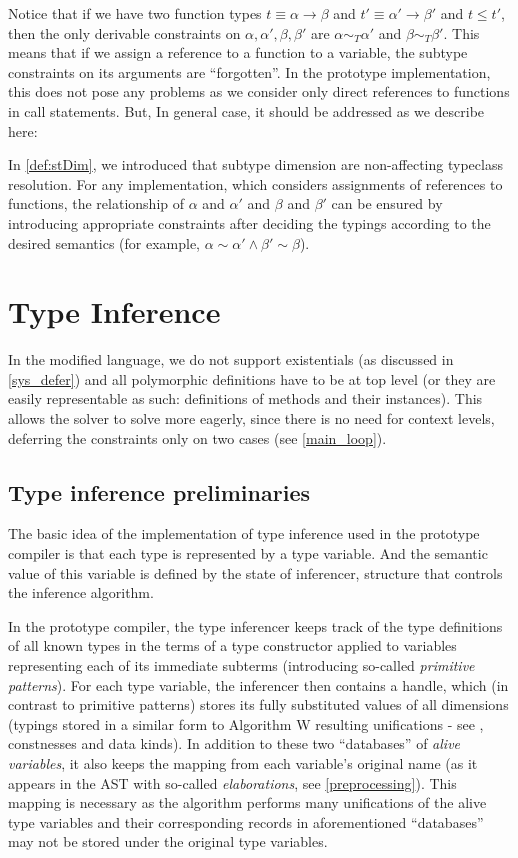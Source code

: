 Notice that if we have two function types $t \equiv \alpha \to \beta$ and $t' \equiv \alpha' \to \beta'$ and $t \leq t'$, then the only derivable constraints on $\alpha, \alpha', \beta, \beta'$ are $\alpha \sim_T \alpha'$ and $\beta \sim_T \beta'$. This means that if we assign a reference to a function to a variable, the subtype constraints on its arguments are ``forgotten''. In the prototype implementation, this does not pose any problems as we consider only direct references to functions in call statements. But, In general case, it should be addressed as we describe here:

In \cref{def:stDim}, we introduced that subtype dimension are non-affecting typeclass resolution. For any implementation, which considers assignments of references to functions, the relationship of $\alpha$ and $\alpha'$ and $\beta$ and $\beta'$ can be ensured by introducing appropriate constraints after deciding the typings according to the desired semantics (for example, $\alpha \sim \alpha' \land \beta' \sim \beta$).

\section{Type Inference}

In the modified \cmm language, we do not support existentials (as discussed in \cref{sys_defer}) and all polymorphic definitions have to be at top level (or they are easily representable as such: definitions of methods and their instances). This allows the solver to solve more eagerly, since there is no need for context levels, deferring the constraints only on two cases (see \cref{main_loop}).

\subsection{Type inference preliminaries}

The basic idea of the implementation of type inference used in the prototype compiler is that each type is represented by a type variable. And the semantic value of this variable is defined by the state of inferencer, structure that controls the inference algorithm.

In the prototype compiler, the type inferencer keeps track of the type definitions of all known types in the terms of a type constructor applied to variables representing each of its immediate subterms (introducing so-called \emph{primitive patterns}). For each type variable, the inferencer then contains a handle, which (in contrast to primitive patterns) stores its fully substituted values of all dimensions (typings stored in a similar form to Algorithm W resulting unifications - see \cite{damas1982principal}, constnesses and data kinds). In addition to these two ``databases'' of \emph{alive variables}, it also keeps the mapping from each variable's original name (as it appears in the AST with so-called \emph{elaborations}, see \cref{preprocessing}). This mapping is necessary as the algorithm performs many unifications of the alive type variables and their corresponding records in aforementioned ``databases'' may not be stored under the original type variables.


